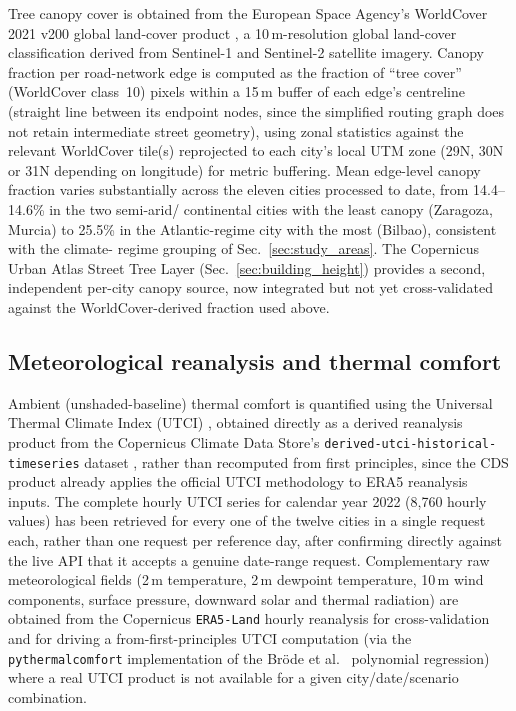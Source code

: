 \documentclass[pdflatex,sn-mathphys-ay]{sn-jnl}
\begin{document}
Tree canopy cover is obtained from the European Space Agency's WorldCover
2021 v200 global land-cover product \cite{esa_worldcover}, a 10\,m-resolution
global land-cover classification derived from Sentinel-1 and Sentinel-2
satellite imagery. Canopy fraction per road-network edge is computed as the
fraction of ``tree cover'' (WorldCover class~10) pixels within a 15\,m buffer
of each edge's centreline (straight line between its endpoint nodes, since the
simplified routing graph does not retain intermediate street geometry), using
zonal statistics against the relevant WorldCover tile(s) reprojected to each
city's local UTM zone (29N, 30N or 31N depending on longitude) for metric
buffering. Mean edge-level canopy fraction varies substantially across the
eleven cities processed to date, from 14.4--14.6\% in the two semi-arid/
continental cities with the least canopy (Zaragoza, Murcia) to 25.5\% in the
Atlantic-regime city with the most (Bilbao), consistent with the climate-
regime grouping of Sec.~\ref{sec:study_areas}. The Copernicus Urban Atlas
Street Tree Layer (Sec.~\ref{sec:building_height}) provides a second,
independent per-city canopy source, now integrated but not yet
cross-validated against the WorldCover-derived fraction used above.

\subsection{Meteorological reanalysis and thermal comfort}
\label{sec:thermal}

Ambient (unshaded-baseline) thermal comfort is quantified using the
Universal Thermal Climate Index (UTCI) \cite{brode2012utci}, obtained
directly as a derived reanalysis product from the Copernicus Climate Data
Store's \texttt{derived-utci-historical-timeseries} dataset
\cite{cds_utci}, rather than recomputed from first principles, since the CDS
product already applies the official UTCI methodology to ERA5 reanalysis
inputs. The complete hourly UTCI series for calendar year 2022 (8{,}760
hourly values) has been retrieved for every one of the twelve cities in a
single request each, rather than one request per reference day, after
confirming directly against the live API that it accepts a genuine date-range
request. Complementary raw meteorological fields (2\,m temperature, 2\,m
dewpoint temperature, 10\,m wind components, surface pressure, downward solar
and thermal radiation) are obtained from the Copernicus \texttt{ERA5-Land}
hourly reanalysis \cite{era5_land} for cross-validation and for driving a
from-first-principles UTCI computation (via the \texttt{pythermalcomfort}
implementation of the Bröde et al.\ \cite{brode2012utci} polynomial
regression) where a real UTCI product is not available for a given
city/date/scenario combination.
\end{document}
